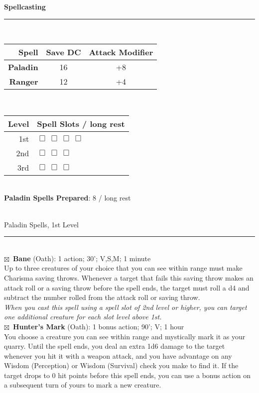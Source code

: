 \documentclass[11pt]{article}
\newcommand{\heading}[1]{{\sc\bfseries #1}}
\newcommand{\spell}[1]{{\sc\bfseries #1}}
\newcommand{\available}{{\Large $\boxtimes$}\ }
\newcommand{\checkboxThree}{{\Large $\Box \, \Box \, \Box$}}
\newcommand{\checkboxFour}{{\Large $\Box \, \Box \, \Box \, \Box$}}
\begin{document}
{\clearpage
\noindent
{\sc\bfseries\Large Spellcasting}
\vspace*{4pt}
\hrule
\mbox{ }
\\
\noindent
\begin{tabular}[t]{|r||c|c|}
\hline
\heading{Spell} & \heading{Save DC} & \heading {Attack Modifier}
\\ \hline \hline
\heading{Paladin} & 16 & +8
\\ \hline
\heading{Ranger} & 12 & +4
\\ \hline
\end{tabular}
%
\ \ \ \
%
\begin{tabular}[t]{|r|l|}
\hline
\heading{Level} & \heading{Spell Slots} / long rest
\\ \hline \hline
{\sc 1st} & \checkboxFour
\\
{\sc 2nd} & \checkboxThree
\\
{\sc 3rd} & \checkboxThree
\\ \hline
\end{tabular}

\mbox{ }
\\[-6pt]
\heading{Paladin Spells Prepared}:  8 / long rest

\mbox{ }
\\
{\Large Paladin Spells, 1st Level}
\hrule

\mbox{ }
\\[6pt]
\available \spell{Bane} (Oath): 1 action; 30'; V,S,M; 1 minute
\\
{\small Up to three creatures of your choice that you can see within
  range must make Charisma saving throws. Whenever a target that fails
  this saving throw makes an attack roll or a saving throw before the
  spell ends, the target must roll a d4 and subtract the number rolled
  from the attack roll or saving throw.}
\\
{\footnotesize\slshape When you cast this spell using a spell slot of
  2nd level or higher, you can target one additional creature for each
  slot level above 1st.}
\\[4pt]
\available \spell{Hunter's Mark} (Oath): 1 bonus action; 90'; V; 1
hour
\\
You choose a creature you can see within range and mystically mark it
as your quarry. Until the spell ends, you deal an extra 1d6 damage to
the target whenever you hit it with a weapon attack, and you have
advantage on any Wisdom (Perception) or Wisdom (Survival) check you
make to find it. If the target drops to 0 hit points before this spell
ends, you can use a bonus action on a subsequent turn of yours to mark
a new creature.

}
\end{document}
